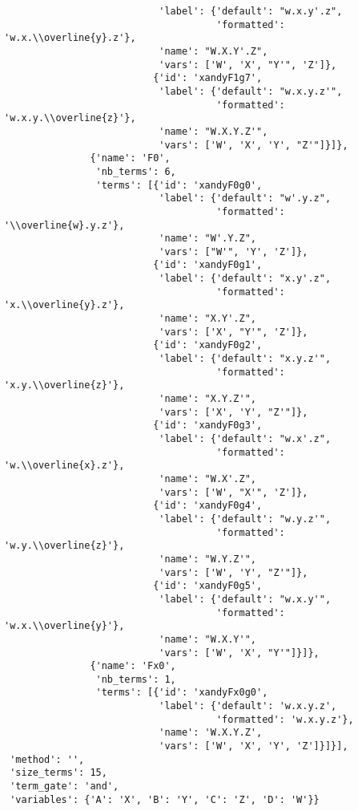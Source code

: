 \begin{verbatim}
                           'label': {'default': "w.x.y'.z",
                                     'formatted': 'w.x.\\overline{y}.z'},
                           'name': "W.X.Y'.Z",
                           'vars': ['W', 'X', "Y'", 'Z']},
                          {'id': 'xandyF1g7',
                           'label': {'default': "w.x.y.z'",
                                     'formatted': 'w.x.y.\\overline{z}'},
                           'name': "W.X.Y.Z'",
                           'vars': ['W', 'X', 'Y', "Z'"]}]},
               {'name': 'F0',
                'nb_terms': 6,
                'terms': [{'id': 'xandyF0g0',
                           'label': {'default': "w'.y.z",
                                     'formatted': '\\overline{w}.y.z'},
                           'name': "W'.Y.Z",
                           'vars': ["W'", 'Y', 'Z']},
                          {'id': 'xandyF0g1',
                           'label': {'default': "x.y'.z",
                                     'formatted': 'x.\\overline{y}.z'},
                           'name': "X.Y'.Z",
                           'vars': ['X', "Y'", 'Z']},
                          {'id': 'xandyF0g2',
                           'label': {'default': "x.y.z'",
                                     'formatted': 'x.y.\\overline{z}'},
                           'name': "X.Y.Z'",
                           'vars': ['X', 'Y', "Z'"]},
                          {'id': 'xandyF0g3',
                           'label': {'default': "w.x'.z",
                                     'formatted': 'w.\\overline{x}.z'},
                           'name': "W.X'.Z",
                           'vars': ['W', "X'", 'Z']},
                          {'id': 'xandyF0g4',
                           'label': {'default': "w.y.z'",
                                     'formatted': 'w.y.\\overline{z}'},
                           'name': "W.Y.Z'",
                           'vars': ['W', 'Y', "Z'"]},
                          {'id': 'xandyF0g5',
                           'label': {'default': "w.x.y'",
                                     'formatted': 'w.x.\\overline{y}'},
                           'name': "W.X.Y'",
                           'vars': ['W', 'X', "Y'"]}]},
               {'name': 'Fx0',
                'nb_terms': 1,
                'terms': [{'id': 'xandyFx0g0',
                           'label': {'default': 'w.x.y.z',
                                     'formatted': 'w.x.y.z'},
                           'name': 'W.X.Y.Z',
                           'vars': ['W', 'X', 'Y', 'Z']}]}],
 'method': '',
 'size_terms': 15,
 'term_gate': 'and',
 'variables': {'A': 'X', 'B': 'Y', 'C': 'Z', 'D': 'W'}}
\end{verbatim}





